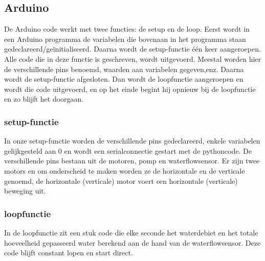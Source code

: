 \documentclass[kulak]{kulakarticle} %
\begin{document}
	\subsection{Arduino}
		De Arduino code werkt met twee functies: de setup en de loop. Eerst wordt in een Arduino programma de variabelen die bovenaan in het programma staan gedeclareerd/geïnitialiseerd. Daarna wordt de setup-functie één keer aangeroepen. Alle code die in deze functie is geschreven, wordt uitgevoerd. Meestal worden hier de verschillende pins benoemd, waarden aan variabelen gegeven,enz. Daarna wordt de setup-functie afgesloten. Dan wordt de loopfunctie aangeroepen en wordt die code uitgevoerd, en op het einde begint hij opnieuw bij de loopfunctie en zo blijft het doorgaan.
		
		\subsubsection{setup-functie}
		In onze setup-functie worden de verschillende pins gedeclareerd, enkele variabelen gelijkgesteld aan 0 en wordt een serialconnectie gestart met de pythoncode. De verschillende pins bestaan uit de motoren, pomp en waterflowsensor. Er zijn twee motors en om onderscheid te maken worden ze de horizontale en de verticale genoemd, de horizontale (verticale) motor voert een horizontale (verticale) beweging uit.
		
		\subsubsection{loopfunctie}
		
		In de loopfunctie zit een stuk code die elke seconde het waterdebiet en het totale hoeveelheid gepasseerd water berekend aan de hand van de waterflowsensor. Deze code blijft constant lopen en start direct.
		
\end{document}

